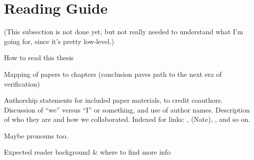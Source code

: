 \section{Reading Guide}


(This subsection is not done yet, but not really needed to understand what I'm going for, since it's pretty low-level.)

How to read this thesis

Mapping of papers to chapters (conclusion paves path to the next era of verification)

Authorship statements for included paper materials, to credit coauthors. Discussion of ``we'' versus ``I'' or something, and use of author names.
Description of who they are and how we collaborated.
Indexed for links: ,  (Nate),
, and so on.

Maybe pronouns too.

Expected reader background \& where to find more info
